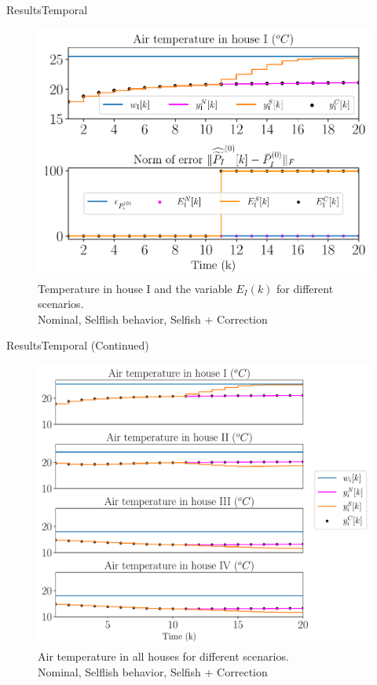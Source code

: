 \documentclass[aspectratio=169]{beamer}
\begin{document}
\begin{frame}{Results}{Temporal}
  \begin{figure}[h]
    \centering
    \includegraphics[width=.5\textwidth,trim=0 .3cm 0 .2cm,clip]{../img/resilient_ineq/ErrorWX_command_normErrH.pdf}
    \caption*{Temperature in house I and the variable $E_{I}(k)$ for different scenarios.\\ {} Nominal, {} Selflish behavior, {} Selfish + Correction}
  \end{figure}
\end{frame}

\begin{frame}{Results}{Temporal (Continued)}
  \begin{figure}[h]
    \centering
    \includegraphics[width=.5\textwidth,trim=0 .3cm 0 .2cm,clip]{../img/resilient_ineq/ErrorWX_command_normErrH_all_houses.pdf}
    \caption*{Air temperature in all houses for different scenarios. \\ {} Nominal, {} Selflish behavior, {} Selfish + Correction}
  \end{figure}
\end{frame}
\end{document}
